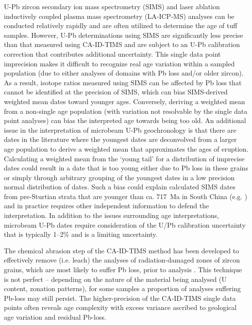 U-Pb zircon secondary ion mass spectrometry (SIMS) and laser ablation inductively coupled plasma mass spectrometry (LA-ICP-MS) analyses can be conducted relatively rapidly and are often utilized to determine the age of tuff samples. However, U-Pb determinations using SIMS are significantly less precise than that measured using CA-ID-TIMS and are subject to an U-Pb calibration correction that contributes additional uncertainty. This single data point imprecision makes it difficult to recognize real age variation within a sampled population (due to either analyses of domains with Pb loss and/or older zircon). As a result, isotope ratios measured using SIMS can be affected by Pb loss that cannot be identified at the precision of SIMS, which can bias SIMS-derived weighted mean dates toward younger ages. Conversely, deriving a weighted mean from a non-single age population (with variation not resolvable by the single data point analyses) can bias the interpreted age towards being too old. An additional issue in the interpretation of microbeam U-Pb geochronology is that there are dates in the literature where the youngest dates are deconvolved from a larger age population to derive a weighted mean that approximates the ages of eruption. Calculating a weighted mean from the `young tail' for a distribution of imprecise dates could result in a date that is too young either due to Pb loss in these grains or simply through arbitrary grouping of the youngest dates in a low precision normal distribution of dates. Such a bias could explain calculated SIMS dates from pre-Sturtian strata that are younger than ca. 717~Ma in South China (e.g. \citealp{Lan2015a}) and in practice requires other independent information to defend the interpretation. In addition to the issues surrounding age interpretations, microbeam U-Pb dates require consideration of the U/Pb calibration uncertainty that is typically 1--2\% and is a limiting uncertainty.

The chemical abrasion step of the CA-ID-TIMS method has been developed to effectively remove (i.e. leach) the analyses of radiation-damaged zones of zircon grains, which are most likely to suffer Pb loss, prior to analysis \citep{Mattinson2005a}. This technique is not perfect -- depending on the nature of the material being analysed (U content, zonation patterns), for some samples a proportion of analyses suffering Pb-loss may still persist. The higher-precision of the CA-ID-TIMS single data points often reveals age complexity with excess variance ascribed to geological age variation and residual Pb-loss.

